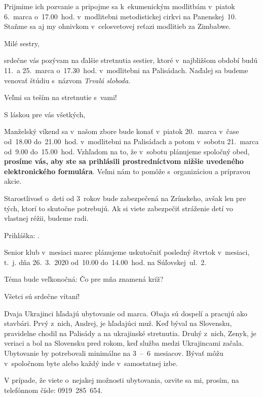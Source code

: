 Prijmime ich pozvanie a pripojme sa k~ekumenickým modlitbám v~piatok 6.~marca o~17.00~hod. v~modlitebni metodistickej cirkvi na Panenskej~10. Staňme sa aj my ohnivkom v~celosvetovej reťazi modlitieb za Zimbabwe.


Milé sestry,

srdečne vás pozývam na ďalšie stretnutia sestier, ktoré v~najbližšom období budú 11.~a 25.~marca o~17.30~hod. v~modlitebni na Palisádach. Naďalej sa budeme venovať štúdiu s~názvom {\it Trvalá sloboda}.

Veľmi sa teším na stretnutie s~vami!

S láskou pre vás všetkých,



Manželský víkend sa v~našom zbore bude konať v~piatok 20.~marca v~čase od~18.00 do~21.00~hod. v~modlitebni na Palisádach a potom v~sobotu 21.~marca od~9.00 do~15.00~hod. Vzhľadom na to, že v~sobotu plánujeme spoločný obed, {\bf prosíme vás, aby ste sa prihlásili prostredníctvom nižšie uvedeného elektronického formulára}. Veľmi nám to pomôže s~organizáciou a prípravou akcie.

Starostlivosť o~deti od 3~rokov bude zabezpečená na Zrínskeho, avšak len pre tých, ktorí to skutočne potrebujú. Ak si viete zabezpečiť stráženie detí vo vlastnej réžii, budeme radi.

Prihláška: .
\vfill\break


Senior klub v~mesiaci marec plánujeme uskutočniť posledný štvrtok v~mesiaci, t.~j. dňa 26.~3.~2020 od~10.00 do~14.00~hod. na Súľovskej~ul.~2.

Téma bude veľkonočná: Čo pre mňa znamená kríž?

Všetci sú srdečne vítaní!



Dvaja Ukrajinci hľadajú ubytovanie od marca. Obaja sú dospelí a pracujú ako stavbári. Prvý z~nich, Andrej, je hľadajúci muž. Keď býval na Slovensku, pravidelne chodil na Palisády a na ukrajinské stretnutia. Druhý z~nich, Zenyk, je veriaci a bol na Slovensku pred rokom, keď služba medzi Ukrajincami začala. Ubytovanie by potrebovali minimálne na 3~--~6~mesiacov. Bývať môžu v~spoločnom byte alebo každý inde v~samostatnej izbe.

V prípade, že viete o~nejakej možnosti ubytovania, ozvite sa mi, prosím, na telefónnom čísle: 0919~285~654.

